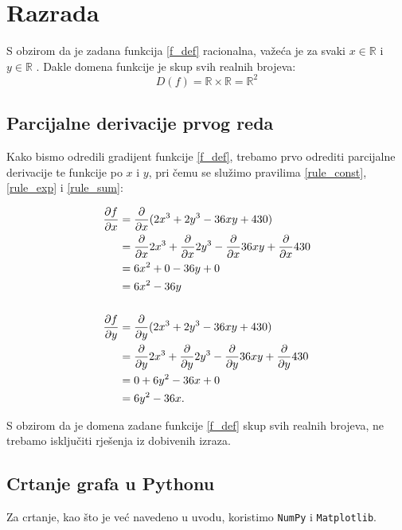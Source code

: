 \chapter{Razrada}

S obzirom da je zadana funkcija \eqref{f_def} racionalna, važeća je za svaki $x \in \mathbb{R}$ i $y \in \mathbb{R}$ \cite[vidi][stranica 119]{kolegij}.
Dakle domena funkcije je skup svih realnih brojeva:
$$
    D(f) = \mathbb{R} \times \mathbb{R} = \mathbb{R}^2
$$

\section{Parcijalne derivacije prvog reda}

Kako bismo odredili gradijent funkcije \eqref{f_def}, trebamo prvo odrediti parcijalne derivacije te funkcije po $x$ i $y$, pri čemu se služimo pravilima \eqref{rule_const}, \eqref{rule_exp} i \eqref{rule_sum}:

\begin{align*}
    \frac{\partial f}{\partial x} & = \frac{\partial}{\partial x} (2x^3 + 2y^3 - 36xy + 430) \\
    & = \frac{\partial}{\partial x} 2x^3 + \frac{\partial}{\partial x}2y^3 - \frac{\partial}{\partial x}36xy + \frac{\partial}{\partial x}430 \\
    & = 6x^2 + 0 - 36y + 0 \\
    & = 6x^2 - 36y \\
    \\
    \frac{\partial f}{\partial y} & = \frac{\partial}{\partial y} (2x^3 + 2y^3 - 36xy + 430) \\
    & = \frac{\partial}{\partial y} 2x^3 + \frac{\partial}{\partial y}2y^3 - \frac{\partial}{\partial y}36xy + \frac{\partial}{\partial y}430 \\
    & = 0 + 6y^2 - 36x + 0\\
    & = 6y^2 - 36x \textnormal{.}
\end{align*}

S obzirom da je domena zadane funkcije \eqref{f_def} skup svih realnih brojeva, ne trebamo isključiti rješenja iz dobivenih izraza.

\newpage
\section{Crtanje grafa u Pythonu}

Za crtanje, kao što je već navedeno u uvodu, koristimo \verb|NumPy| i \verb|Matplotlib|.

